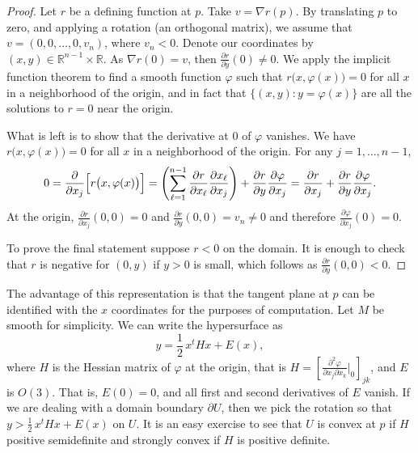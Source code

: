 \documentclass[12pt,openany]{book}
\newcommand{\R}{{\mathbb{R}}}
\theoremstyle{plain}
\theoremstyle{remark}
\theoremstyle{definition}
\theoremstyle{exercise}
\theoremstyle{example}
\begin{document}
\begin{proof}
Let $r$ be a defining function at $p$.  Take $v = \nabla r (p)$.
By translating $p$ to zero, and applying a rotation (an orthogonal matrix),
we assume that $v = (0,0,\ldots,0,v_n)$, where $v_n < 0$.  Denote our
coordinates by $(x,y) \in \R^{n-1} \times \R$.  As $\nabla r(0) =
v$, then $\frac{\partial r}{\partial y}(0) \not= 0$.  We apply 
the implicit function theorem to find a
smooth %
function $\varphi$ such that
$r\bigl(x,\varphi(x)\bigr) = 0$ for all $x$ in a neighborhood of the
origin, and in fact that $\{ (x,y) : y=\varphi(x) \}$ are all the
solutions to $r = 0$ near the origin.

What is left is to show that the derivative at 0 of $\varphi$ vanishes.
We have
$r\bigl(x,\varphi(x)\bigr) = 0$ for all $x$ in a neighborhood of the
origin.
For any $j=1,\ldots,n-1$,
\begin{equation*}
0 = 
\frac{\partial}{\partial x_j} \Bigl[
r\bigl(x,\varphi(x)\bigr) 
\Bigr]
=
\left(
\sum_{\ell=1}^{n-1}
\frac{\partial r}{\partial x_\ell}
\frac{\partial x_\ell}{\partial x_j}
\right)
+
\frac{\partial r}{\partial y}
\frac{\partial \varphi}{\partial x_j}
=
\frac{\partial r}{\partial x_j}
+
\frac{\partial r}{\partial y}
\frac{\partial \varphi}{\partial x_j} .
\end{equation*}
At the origin,
$\frac{\partial r}{\partial x_j}(0,0) = 0$ and
$\frac{\partial r}{\partial y}(0,0) = v_n \not= 0$ and therefore
$\frac{\partial \varphi}{\partial x_j}(0) = 0$.

To prove the final statement suppose
$r < 0$ on the domain.  It is enough to check that $r$ is
negative for $(0,y)$ if $y > 0$ is small, which follows as $\frac{\partial
r}{\partial y}(0,0) < 0$.
\end{proof}

The advantage of this representation is that the tangent plane at $p$
can be identified with the $x$ coordinates for the purposes of computation.
Let $M$ be smooth for simplicity.
We can write the hypersurface as
\begin{equation*}
y = \frac{1}{2}\, x^t H x + E(x) ,
\end{equation*}
where $H$ is the Hessian matrix of $\varphi$ at the origin, that is $H = \left[
\frac{\partial^2 \varphi}{\partial x_j \partial x_k} \big|_{0} \right]_{jk}$,
and $E$ is $O(3)$.  That is, $E(0) = 0$, and
all first and second derivatives of $E$ vanish.  If we are dealing with a domain boundary
$\partial U$, then
we pick the rotation so that $y > \frac{1}{2}\,x^t H x + E(x)$ on $U$.
It is an easy exercise to see that $U$ is convex at $p$ if
$H$ positive semidefinite and strongly convex if $H$ is positive definite.
\end{document}
